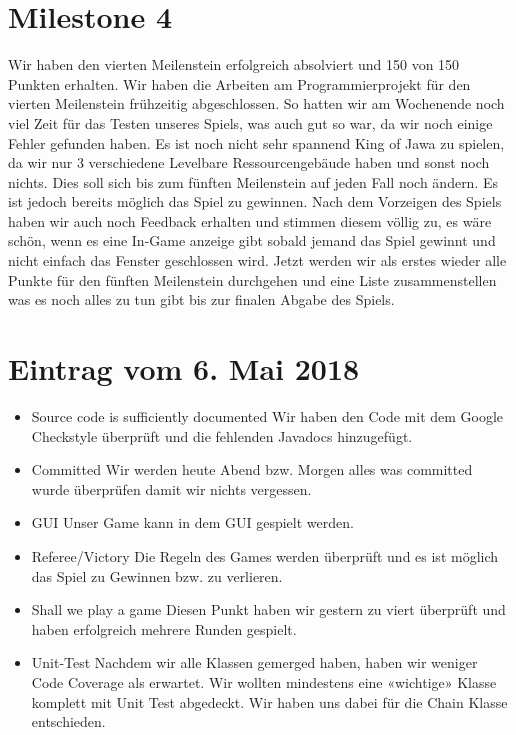 \documentclass{scrartcl}
\newcommand{\n}{\newline}
\begin{document}
\section*{Milestone 4}
Wir haben den vierten Meilenstein erfolgreich absolviert und 150 von 150 Punkten erhalten. Wir haben die Arbeiten am Programmierprojekt für den vierten Meilenstein frühzeitig abgeschlossen. So hatten wir am Wochenende noch viel Zeit für das Testen unseres Spiels, was auch gut so war, da wir noch einige Fehler gefunden haben. Es ist noch nicht sehr spannend King of Jawa zu spielen, da wir nur 3 verschiedene Levelbare Ressourcengebäude haben und sonst noch nichts. Dies soll sich bis zum fünften Meilenstein auf jeden Fall noch ändern. Es ist jedoch bereits möglich das Spiel zu gewinnen. Nach dem Vorzeigen des Spiels haben wir auch noch Feedback erhalten und stimmen diesem völlig zu, es wäre schön, wenn es eine In-Game anzeige gibt sobald jemand das Spiel gewinnt und nicht einfach das Fenster geschlossen wird. Jetzt werden wir als erstes wieder alle Punkte für den fünften Meilenstein durchgehen und eine Liste zusammenstellen was es noch alles zu tun gibt bis zur finalen Abgabe des Spiels. 

\section*{Eintrag vom 6. Mai 2018}
\begin{itemize}
	\item Source code is sufficiently documented \n
	Wir haben den Code mit dem Google Checkstyle überprüft und die fehlenden Javadocs hinzugefügt.
	\item Committed \n
 	Wir werden heute Abend bzw. Morgen alles was committed wurde überprüfen damit wir nichts vergessen.
	\item GUI \n
	Unser Game kann in dem GUI gespielt werden.
	\item Referee/Victory \n
	Die Regeln des Games werden überprüft und es ist möglich das Spiel zu Gewinnen bzw. zu verlieren. 
	\item Shall we play a game \n
	Diesen Punkt haben wir gestern zu viert überprüft und haben erfolgreich mehrere Runden gespielt.
	\item Unit-Test \n
	Nachdem wir alle Klassen gemerged haben, haben wir weniger Code Coverage als erwartet. 
	Wir wollten mindestens eine «wichtige» Klasse komplett mit Unit Test abgedeckt. Wir haben uns dabei für die Chain Klasse entschieden. 
\end{itemize}
\end{document}
